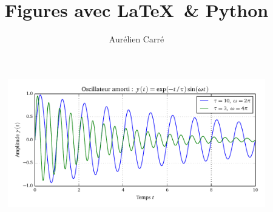 \documentclass[10pt,a4paper]{article}
\title{Figures avec \LaTeX \ \& Python}
\author{Aurélien Carré}
\begin{document}
\maketitle

\lipsum[1-13]

\begin{figure}[h]
\begin{center}
\includegraphics{Oscillateur}
\end{center}
\end{figure}

\lipsum[1-13]
\end{document}
